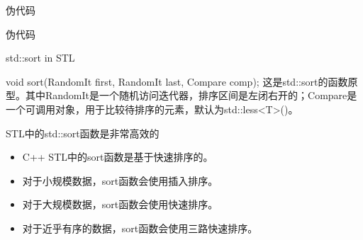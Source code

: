 \documentclass{ldr-simple-gray}
\begin{document}
  \begin{frame}{伪代码}
    \begin{algorithm}[H]
      \caption{Heap Sort}
      \begin{algorithmic}[1]
        \ENDFOR
      \end{algorithmic}
    \end{algorithm}

    \begin{algorithm}[H]
      \caption{Build Heap}
      \begin{algorithmic}[1]
        \ENDFOR
      \end{algorithmic}
    \end{algorithm}
  \end{frame}

  \begin{frame}{伪代码}
    \begin{algorithm}[H]
      \caption{Adjust Heap}
      \begin{algorithmic}[1]
          \ENDIF
          \ENDIF
        \ENDFOR
      \end{algorithmic}
    \end{algorithm}
  \end{frame}

  \begin{frame}{std::sort in STL}
    \begin{block}{void sort(RandomIt first, RandomIt last, Compare comp);}
      这是std::sort的函数原型。其中RandomIt是一个随机访问迭代器，排序区间是左闭右开的；Compare是一个可调用对象，用于比较待排序的元素，默认为std::less<T>()。
    \end{block}

    \begin{block}{STL中的std::sort函数是非常高效的}
      \begin{itemize}
        \item C++ STL中的sort函数是基于快速排序的。
        \item 对于小规模数据，sort函数会使用插入排序。
        \item 对于大规模数据，sort函数会使用快速排序。
        \item 对于近乎有序的数据，sort函数会使用三路快速排序。
      \end{itemize}
    \end{block}
  \end{frame}
\end{document}

